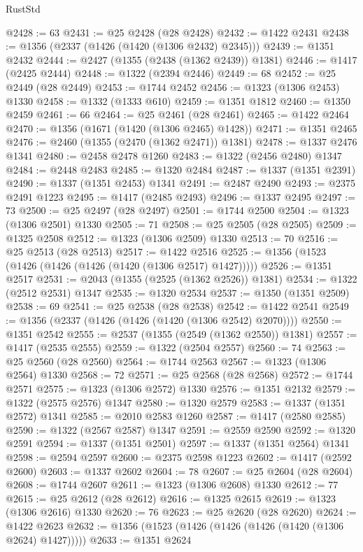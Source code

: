 \begin{lexlean}{RustStd}
\begin{coremodule}
@2428 := 63
@2431 := @25 @2428 (@28 @2428)
@2432 := @1422 @2431
@2438 := @1356 (@2337 (@1426 (@1420 (@1306 @2432) @2345)))
@2439 := @1351 @2432
@2444 := @2427 (@1355 (@2438 (@1362 @2439)) @1381)
@2446 := @1417 (@2425 @2444)
@2448 := @1322 (@2394 @2446)
@2449 := 68
@2452 := @25 @2449 (@28 @2449)
@2453 := @1744 @2452
@2456 := @1323 (@1306 @2453) @1330
@2458 := @1332 (@1333 @610)
@2459 := @1351 @1812
@2460 := @1350 @2459
@2461 := 66
@2464 := @25 @2461 (@28 @2461)
@2465 := @1422 @2464
@2470 := @1356 (@1671 (@1420 (@1306 @2465) @1428))
@2471 := @1351 @2465
@2476 := @2460 (@1355 (@2470 (@1362 @2471)) @1381)
@2478 := @1337 @2476 @1341
@2480 := @2458 @2478 @1260
@2483 := @1322 (@2456 @2480) @1347
@2484 := @2448 @2483
@2485 := @1320 @2484
@2487 := @1337 (@1351 @2391)
@2490 := @1337 (@1351 @2453) @1341
@2491 := @2487 @2490
@2493 := @2375 @2491 @1223
@2495 := @1417 (@2485 @2493)
@2496 := @1337 @2495
@2497 := 73
@2500 := @25 @2497 (@28 @2497)
@2501 := @1744 @2500
@2504 := @1323 (@1306 @2501) @1330
@2505 := 71
@2508 := @25 @2505 (@28 @2505)
@2509 := @1325 @2508
@2512 := @1323 (@1306 @2509) @1330
@2513 := 70
@2516 := @25 @2513 (@28 @2513)
@2517 := @1422 @2516
@2525 := @1356 (@1523 (@1426 (@1426 (@1426 (@1420 (@1306 @2517) @1427)))))
@2526 := @1351 @2517
@2531 := @2043 (@1355 (@2525 (@1362 @2526)) @1381)
@2534 := @1322 (@2512 @2531) @1347
@2535 := @1320 @2534
@2537 := @1350 (@1351 @2509)
@2538 := 69
@2541 := @25 @2538 (@28 @2538)
@2542 := @1422 @2541
@2549 := @1356 (@2337 (@1426 (@1426 (@1420 (@1306 @2542) @2070))))
@2550 := @1351 @2542
@2555 := @2537 (@1355 (@2549 (@1362 @2550)) @1381)
@2557 := @1417 (@2535 @2555)
@2559 := @1322 (@2504 @2557)
@2560 := 74
@2563 := @25 @2560 (@28 @2560)
@2564 := @1744 @2563
@2567 := @1323 (@1306 @2564) @1330
@2568 := 72
@2571 := @25 @2568 (@28 @2568)
@2572 := @1744 @2571
@2575 := @1323 (@1306 @2572) @1330
@2576 := @1351 @2132
@2579 := @1322 (@2575 @2576) @1347
@2580 := @1320 @2579
@2583 := @1337 (@1351 @2572) @1341
@2585 := @2010 @2583 @1260
@2587 := @1417 (@2580 @2585)
@2590 := @1322 (@2567 @2587) @1347
@2591 := @2559 @2590
@2592 := @1320 @2591
@2594 := @1337 (@1351 @2501)
@2597 := @1337 (@1351 @2564) @1341
@2598 := @2594 @2597
@2600 := @2375 @2598 @1223
@2602 := @1417 (@2592 @2600)
@2603 := @1337 @2602
@2604 := 78
@2607 := @25 @2604 (@28 @2604)
@2608 := @1744 @2607
@2611 := @1323 (@1306 @2608) @1330
@2612 := 77
@2615 := @25 @2612 (@28 @2612)
@2616 := @1325 @2615
@2619 := @1323 (@1306 @2616) @1330
@2620 := 76
@2623 := @25 @2620 (@28 @2620)
@2624 := @1422 @2623
@2632 := @1356 (@1523 (@1426 (@1426 (@1426 (@1420 (@1306 @2624) @1427)))))
@2633 := @1351 @2624

\end{coremodule}
\end{lexlean}
